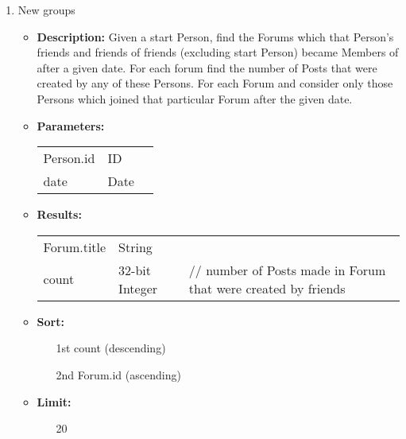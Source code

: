 {\begin{enumerate}
        \item New groups
            \begin{itemize}
                \item \textbf{Description:}
                    Given a start Person, find the Forums which that Person's friends
                    and friends of friends (excluding start Person) became Members of
                    after a given date.  For each forum find the number of Posts
                    that were created by any of these Persons.
                    For each Forum and consider only
                    those Persons which joined that particular
                    Forum after the given date.
                \item \textbf{Parameters:} \\
                    \begin{tabular}{lll}
                        Person.id 										& ID & \\
                        date 											& Date & \\
                    \end{tabular}
                \item \textbf{Results:} \\
                    \begin{tabular}{lll}
                        Forum.title 										& String & \\
                        count 	 											& 32-bit Integer & \parbox[t]{20cm}{// number of Posts made in Forum that were created 																							by friends \par \strut} \\
                    \end{tabular}
                \item \textbf{Sort:}
                  \begin{itemize}
                    \item[1st] count (descending)
                    \item[2nd] Forum.id (ascending)
                  \end{itemize}
                \item \textbf{Limit:}
                  \begin{itemize}
                    \item[] 20
                  \end{itemize}
            \end{itemize}


\end{enumerate}}

